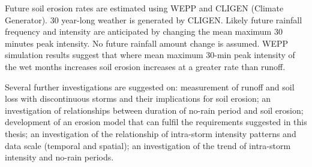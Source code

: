 \begin{abstractseparate}
Future soil erosion rates are estimated using WEPP and CLIGEN (Climate
Generator). 30 year-long weather is generated by CLIGEN. Likely future rainfall
frequency and intensity are anticipated by changing the mean maximum 30 minutes
peak intensity. No future rainfall amount change is assumed. WEPP simulation
results suggest that where mean maximum 30-min peak intensity of the wet months
increases soil erosion increases at a greater rate than runoff.

Several further investigations are suggested on: measurement of runoff and soil
loss with discontinuous storms and their implications for soil erosion; an
investigation of relationships between duration of no-rain period and soil
erosion; development of an erosion model that can fulfil the requirements
suggested in this thesis; an investigation of the relationship of intra-storm
intensity patterns and data scale (temporal and spatial); an investigation of
the trend of intra-storm intensity and no-rain periods.
\end{abstractseparate}